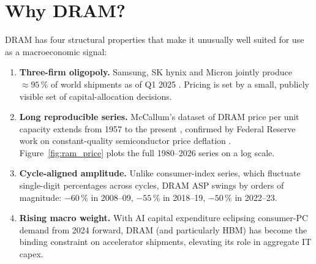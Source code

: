 \documentclass[11pt,a4paper]{article}
\begin{document}
\section{Why DRAM?}\label{sec:why}

DRAM has four structural properties that make it unusually well suited for use as a macroeconomic signal:

\begin{enumerate}
\item \textbf{Three-firm oligopoly.} Samsung, SK hynix and Micron jointly produce $\approx 95\,\%$ of world shipments as of Q1 2025 \citep{lapedus2025}. Pricing is set by a small, publicly visible set of capital-allocation decisions.

\item \textbf{Long reproducible series.} McCallum's dataset of DRAM price per unit capacity extends from 1957 to the present \citep{mccallum2024}, confirmed by Federal Reserve work on constant-quality semiconductor price deflation \citep{aizcorbe2006}. Figure~\ref{fig:ram_price} plots the full 1980--2026 series on a log scale.

\item \textbf{Cycle-aligned amplitude.} Unlike consumer-index series, which fluctuate single-digit percentages across cycles, DRAM ASP swings by orders of magnitude: $-60\,\%$ in 2008--09, $-55\,\%$ in 2018--19, $-50\,\%$ in 2022--23.

\item \textbf{Rising macro weight.} With AI capital expenditure eclipsing consumer-PC demand from 2024 forward, DRAM (and particularly HBM) has become the binding constraint on accelerator shipments, elevating its role in aggregate IT capex.
\end{enumerate}
\end{document}
